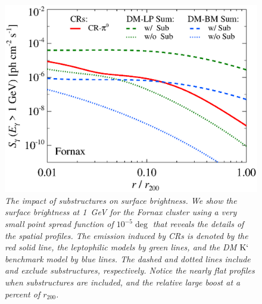 \documentclass[10pt,aps,pra,reprint,amsmath,amsfonts,amssymb,showpacs]{revtex4-1}
\newcommand{\rmn}{\mathrm}
\newcommand{\rvir}{r_{200}}
\newcommand{\Km}{\rmn{K}`}
\begin{document}
\begin{figure}%
 \includegraphics[width=0.99\columnwidth]{figures/SB.resolved.v9.1GeV.SF300.noSuB.vs.SubMass.elmu.eps}
\caption{\it The impact of substructures on surface brightness. We
  show the surface brightness at 1~GeV for the Fornax cluster using a
  very small point spread function of $10^{-5}\deg$ that reveals the
  details of the spatial profiles. The emission induced by CRs is
  denoted by the red solid line, the leptophilic models by green
  lines, and the DM $\Km$ benchmark model by blue lines. The dashed
  and dotted lines include and exclude substructures,
  respectively. Notice the nearly flat profiles when substructures are
  included, and the relative large boost at a percent of $\rvir$.}
 \label{fig11}
\end{figure}
\end{document}
